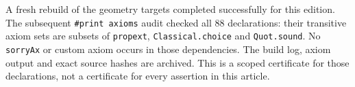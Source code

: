 A fresh rebuild of the geometry targets completed successfully for this edition. The subsequent \texttt{\#print axioms} audit checked all 88 declarations: their transitive axiom sets are subsets of \texttt{propext}, \texttt{Classical.choice} and \texttt{Quot.sound}. No \texttt{sorryAx} or custom axiom occurs in those dependencies. The build log, axiom output and exact source hashes are archived. This is a scoped certificate for those declarations, not a certificate for every assertion in this article.
